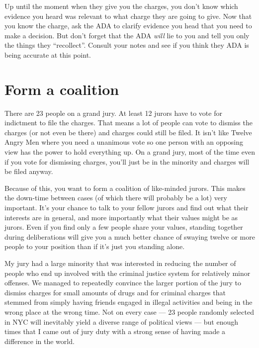 \documentclass[letterpaper]{article}
\begin{document}
Up until the moment when they give you the charges, you don't know which evidence you heard was relevant to what charge they are going to give. 
Now that you know the charge, ask the ADA to clarify evidence you head that you need to make a decision. 
But don't forget that the ADA \emph{will} lie to you and tell you only the things they ``recollect''.  
Consult your notes and see if you think they ADA is being accurate at this point.

\section*{Form a coalition}
There are 23 people on a grand jury. 
At least 12 jurors have to vote for indictment to file the charges. 
That means a lot of people can vote to dismiss the charges (or not even be there) and charges could still be filed.
It isn't like Twelve Angry Men where you need a unanimous vote so one person with an opposing view has the power to hold everything up.
On a grand jury, most of the time even if you vote for dismissing charges, you'll just be in the minority and charges will be filed anyway.

Because of this, you want to form a coalition of like-minded jurors.
This makes the down-time between cases (of which there will probably be a lot) very important.
It's your chance to talk to your fellow jurors and find out what their interests are in general, and more importantly what their values might be as jurors.
Even if you find only a few people share your values, standing together during deliberations will give you a much better chance of swaying twelve or more people to your position than if it's just you standing alone.

My jury had a large minority that was interested in reducing the number of people who end up involved with the criminal justice system for relatively minor offenses.
We managed to repeatedly convince the larger portion of the jury to dismiss charges for small amounts of drugs and for criminal charges that stemmed from simply having friends engaged in illegal activities and being in the wrong place at the wrong time.
Not on every case --- 23 people randomly selected in NYC will inevitably yield a diverse range of political views --- but enough times that I came out of jury duty with a strong sense of having made a difference in the world.
\end{document}
